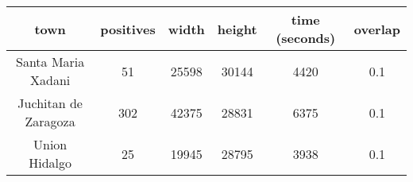 \begin{center}
  \begin{tabular}{|c|c|c|c|c|c|}
    \hline
    town                 & positives & width & height & time (seconds) & overlap\\ \hline
    Santa Maria Xadani   &51         & 25598 & 30144  & 4420           & 0.1 \\ \hline
    Juchitan de Zaragoza &302        & 42375 & 28831  & 6375           & 0.1 \\ \hline
    Union Hidalgo        &25         & 19945 & 28795  & 3938           & 0.1\\
    \hline
  \end{tabular}
\end{center}


